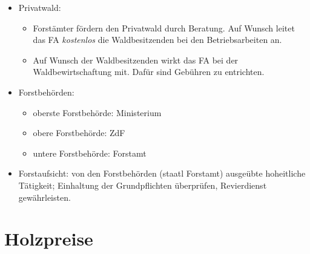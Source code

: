\documentclass{article}
\begin{document}
\begin{itemize}
\begin{itemize}
	 \end{itemize}	


   \item Privatwald: 

    \begin{itemize} 
	
	  \item Forstämter fördern den Privatwald durch Beratung. Auf Wunsch leitet das FA \textit{kostenlos} die Waldbesitzenden bei den Betriebsarbeiten an.

      \item Auf Wunsch der Waldbesitzenden wirkt das FA bei der Waldbewirtschaftung mit. Dafür sind Gebühren zu entrichten.

    \end{itemize}


   \item Forstbehörden: 

    \begin{itemize} 
	
	\item oberste Forstbehörde: Ministerium
	
	\item obere Forstbehörde: ZdF
	
	\item untere Forstbehörde: Forstamt
	
    \end{itemize}


   \item Forstaufsicht: von den Forstbehörden (staatl Forstamt) ausgeübte hoheitliche Tätigkeit; Einhaltung der Grundpflichten überprüfen, Revierdienst gewährleisten.


\end{itemize}


\newpage
\section{Holzpreise}
\end{document}
